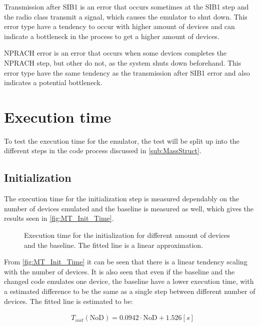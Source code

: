 Transmission after SIB1 is an error that occurs sometimes at the SIB1 step and the radio class transmit a signal, which causes the emulator to shut down. This error type have a tendency to occur with higher amount of devices and can indicate a bottleneck in the process to get a higher amount of devices.

NPRACH error is an error that occurs when some devices completes the NPRACH step, but other do not, as the system shuts down beforehand. This error type have the same tendency as the transmission after SIB1 error and also indicates a potential bottleneck.

\section{Execution time}
To test the execution time for the emulator, the test will be split up into the different steps in the code process discussed in \autoref{sub:MassStruct}.

\subsection{Initialization}
The execution time for the initialization step is measured dependably on the number of devices emulated and the baseline is measured as well, which gives the results seen in \autoref{fig:MT_Init_Time}.


\begin{figure}[H]
\centering
\resizebox{0.7\textwidth}{!}{
}
\caption{Execution time for the initialization for different amount of devices and the baseline. The fitted line is a linear approximation.}
\label{fig:MT_Init_Time}
\end{figure}

From \autoref{fig:MT_Init_Time} it can be seen that there is a linear tendency scaling with the number of devices. It is also seen that even if the baseline and the changed code emulates one device, the baseline have a lower execution time, with a estimated difference to be the same as a single step between different number of devices. The fitted line is estimated to be:

\begin{align}
&T_{init} (\text{NoD}) = 0.0942 \cdot \text{NoD} + 1.526 [s]
\end{align}
\begin{where}
\end{where}


